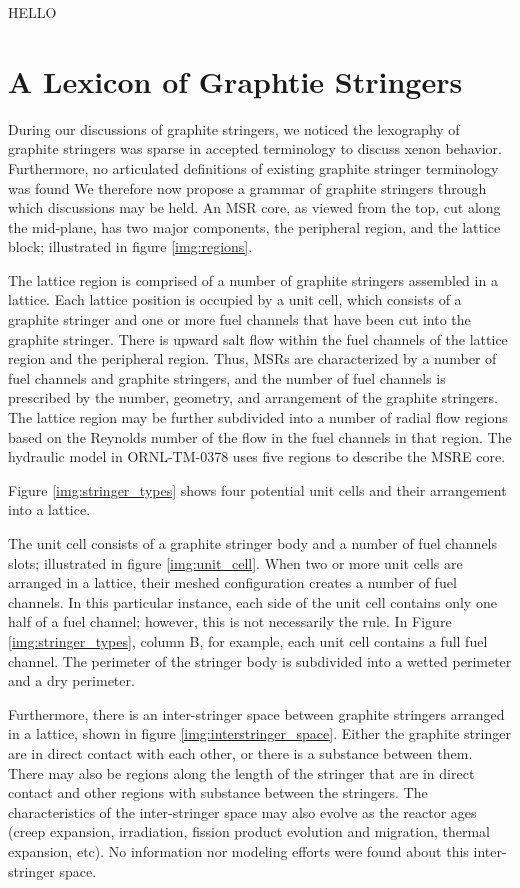 HELLO

\section{A Lexicon of Graphtie Stringers}

During our discussions of graphite stringers, we noticed the lexography of graphite stringers was sparse in accepted terminology to discuss xenon behavior. Furthermore, no articulated definitions of existing graphite stringer terminology was found We therefore now propose a grammar of graphite stringers through which discussions may be held.  An MSR core, as viewed from the top, cut along the mid-plane, has two major components, the peripheral region, and the lattice block; illustrated in figure \ref{img:regions}.


 The lattice region is comprised of a number of graphite stringers assembled in a lattice.  Each lattice position is occupied by a unit cell, which consists of a graphite stringer and one or more fuel channels that have been cut into the graphite stringer.  There is upward salt flow within the fuel channels of the lattice region and the peripheral region.  Thus, MSRs are characterized by a number of fuel channels and graphite stringers, and the number of fuel channels is prescribed by the number, geometry, and arrangement of the graphite stringers. The lattice region may be further subdivided into a number of radial flow regions based on the Reynolds number of the flow in the fuel channels in that region.  The hydraulic model in ORNL-TM-0378 uses five regions to describe the MSRE core. \cite[P. 13]{ORNLTM378}
 
Figure \ref{img:stringer_types} shows four potential unit cells and their arrangement into a lattice.


The unit cell consists of a graphite stringer body and a number of fuel channels slots; illustrated in figure \ref{img:unit_cell}. When two or more unit cells are arranged in a lattice, their meshed configuration creates a number of fuel channels.  In this particular instance, each side of the unit cell contains only one half of a fuel channel; however, this is not necessarily the rule. In Figure \ref{img:stringer_types}, column B, for example, each unit cell contains a full fuel channel. The perimeter of the stringer body is subdivided into a wetted perimeter and a dry perimeter.



Furthermore, there is an inter-stringer space between graphite stringers arranged in a lattice, shown in figure \ref{img:interstringer_space}. Either the graphite stringer are in direct contact with each other, or there is a substance between them. There may also be regions along the length of the stringer that are in direct contact and other regions with substance between the stringers.  The characteristics of the inter-stringer space may also evolve as the reactor ages (creep expansion, irradiation, fission product evolution and migration, thermal expansion, etc). No information nor modeling efforts were found about this inter-stringer space. 
